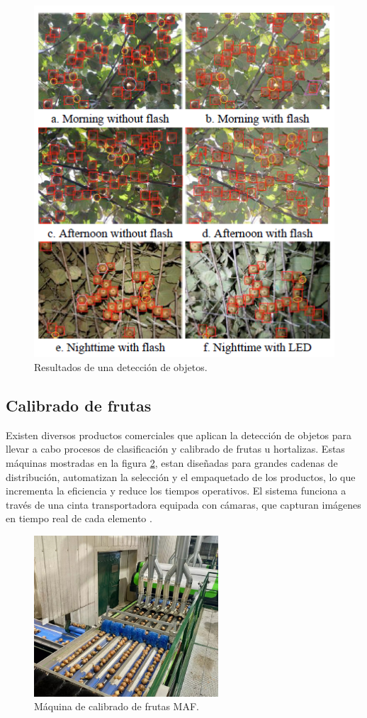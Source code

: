 \begin{figure}[htbp]
	\centering
	\includegraphics[width=.5\textwidth]{./Figures/Song2019.png}
	\caption{Resultados de una detección de objetos\protect\footnotemark.}
	\label{fig:Song2019}
\end{figure}

\vspace{1cm}

\subsection{Calibrado de frutas}

Existen diversos productos comerciales que aplican la detección de objetos para llevar a cabo procesos de clasificación y calibrado de frutas u hortalizas. Estas máquinas mostradas en la figura \ref{fig:calibrado_de_frutas}, estan diseñadas para grandes cadenas de distribución, automatizan la selección y el empaquetado de los productos, lo que incrementa la eficiencia y reduce los tiempos operativos. El sistema funciona a través de una cinta transportadora equipada con cámaras, que capturan imágenes en tiempo real de cada elemento \citep{WEBSITE:Unitec2024}.

\vspace{1cm}
\begin{figure}[htbp]
	\centering
	\includegraphics[width=.6\textwidth, height=6cm]{./Figures/calibrado_de_frutas.jpg}
	\caption{Máquina de calibrado de frutas MAF\protect\footnotemark.}
	\label{fig:calibrado_de_frutas}
\end{figure}
\vspace{1cm}

